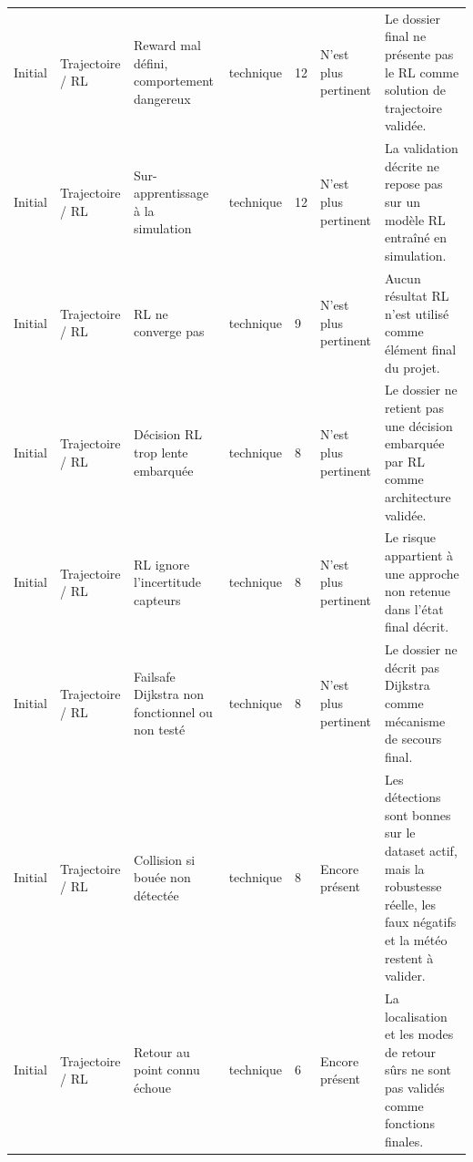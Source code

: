 \documentclass[11pt,letterpaper]{article}
\begin{document}
\begin{longtable}{@{}L{1.55cm}L{2.05cm}L{3.25cm}L{1.95cm}L{1.05cm}L{2.15cm}L{3.55cm}@{}}
    Initial & Trajectoire / RL & Reward mal défini, comportement dangereux & technique & 12 & N'est plus pertinent & Le dossier final ne présente pas le RL comme solution de trajectoire validée. \\
    Initial & Trajectoire / RL & Sur-apprentissage à la simulation & technique & 12 & N'est plus pertinent & La validation décrite ne repose pas sur un modèle RL entraîné en simulation. \\
    Initial & Trajectoire / RL & RL ne converge pas & technique & 9 & N'est plus pertinent & Aucun résultat RL n'est utilisé comme élément final du projet. \\
    Initial & Trajectoire / RL & Décision RL trop lente embarquée & technique & 8 & N'est plus pertinent & Le dossier ne retient pas une décision embarquée par RL comme architecture validée. \\
    Initial & Trajectoire / RL & RL ignore l'incertitude capteurs & technique & 8 & N'est plus pertinent & Le risque appartient à une approche non retenue dans l'état final décrit. \\
    Initial & Trajectoire / RL & Failsafe Dijkstra non fonctionnel ou non testé & technique & 8 & N'est plus pertinent & Le dossier ne décrit pas Dijkstra comme mécanisme de secours final. \\
    Initial & Trajectoire / RL & Collision si bouée non détectée & technique & 8 & Encore présent & Les détections sont bonnes sur le dataset actif, mais la robustesse réelle, les faux négatifs et la météo restent à valider. \\
    Initial & Trajectoire / RL & Retour au point connu échoue & technique & 6 & Encore présent & La localisation et les modes de retour sûrs ne sont pas validés comme fonctions finales. \\


\end{longtable}
\end{document}
